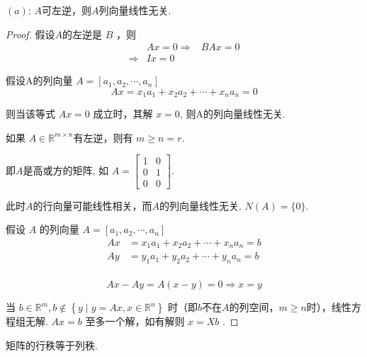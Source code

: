 \begin{theorem}
    $(a)$: $A$可左逆，则$A$列向量线性无关.
\end{theorem}

\begin{proof}
    假设$A$的左逆是 $ B $ ，则
    $$
    \begin{aligned}
            & A x=0 
     \Rightarrow &B A x=0 \\
    \Rightarrow & I x=0
    \end{aligned}
    $$

    假设A的列向量 $ A=\left[a_{1}, a_{2}, \cdots, a_{n}\right] $
    $$
    A x=x_{1} a_{1}+x_{2} a_{2}+\cdots+x_{n} a_{n}=0
    $$

    则当该等式 $ A x=0 $ 成立时，其解 $ x=0 $, 则A的列向量线性无关.  
    
    \begin{corollary}
        如果 $ A \in \mathbb{R}^{m \times n} $有左逆，则有 $ m \geq n = r $. 

    即$A$是高或方的矩阵, 如 $ A=\left[\begin{array}{ll}1 & 0 \\ 0 & 1 \\ 0 & 0\end{array}\right] $. 
    
    此时$A$的行向量可能线性相关，而$A$的列向量线性无关. $N(A) = \{0\}$.
    \end{corollary}
    

    假设 $ A $ 的列向量 $ A=\left[a_{1}, a_{2}, \cdots, a_{n}\right] $
    $$
    \begin{aligned}
         A x&=x_{1} a_{1}+x_{2} a_{2}+\cdots+x_{n} a_{n}=b \\
    A y&=y_{1} a_{1}+y_{2} a_{2}+\cdots+y_{n} a_{n}=b \\
    \end{aligned}
    $$

    $$A x-A y=A(x-y)=0 \Rightarrow x=y$$

    当 $ b \in \mathbb{R}^{m}, b \notin\left\{y \mid y=A x, x \in \mathbb{R}^{n}\right\} $ 时（即$b$不在$A$的列空间，$ m \geq n  $时），线性方程组无解.  $ A x=b $ 至多一个解，如有解则 $ x=X b $ . 
\end{proof}

\begin{theorem}
    矩阵的行秩等于列秩.
\end{theorem}


